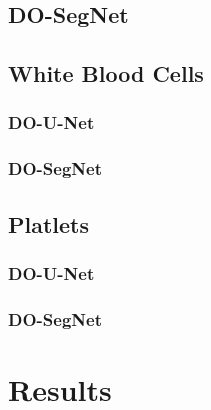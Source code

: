 \subsection{DO-SegNet}

\subsection{White Blood Cells}
\subsubsection{DO-U-Net}
\subsubsection{DO-SegNet}


\subsection{Platlets}
\subsubsection{DO-U-Net}
\subsubsection{DO-SegNet}


\section{Results}
\vspace{0.2in}
\hspace*{0.16in}



